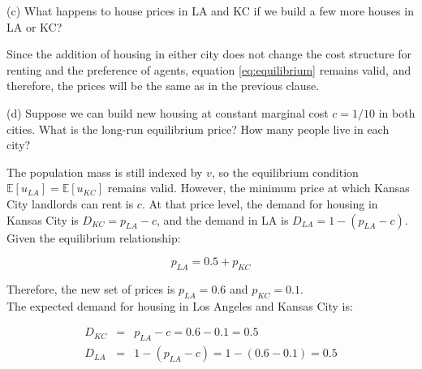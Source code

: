 \begin{tcolorbox}
    (c) What happens to house prices in LA and KC if we build a few more houses in LA or KC?
\end{tcolorbox}

\begin{myanswerbox}
    Since the addition of housing in either city does not change the cost structure for renting and the preference of agents, equation \ref{eq:equilibrium} remains valid, and therefore, the prices will be the same as in the previous clause.
\end{myanswerbox}
\begin{tcolorbox}
    (d) Suppose we can build new housing at constant marginal cost \( c = 1/10 \) in both cities. What is the long-run equilibrium price? How many people live in each city?
\end{tcolorbox}

The population mass is still indexed by \( v \), so the equilibrium condition \( \mathbb{E}[u_{LA}] = \mathbb{E}[u_{KC}] \) remains valid. However, the minimum price at which Kansas City landlords can rent is \( c \). At that price level, the demand for housing in Kansas City is \( D_{KC} = p_{LA} - c \), and the demand in LA is \( D_{LA} = 1 - (p_{LA} - c). \)\\

Given the equilibrium relationship: 

    \begin{equation*}
    p_{LA} = 0.5 + p_{KC}
\end{equation*}

\begin{myanswerbox}
    
    Therefore, the new set of prices is \( p_{LA} = 0.6 \) and \( p_{KC} = 0.1 \).\\

    The expected demand for housing in Los Angeles and Kansas City is:

    \begin{eqnarray*}
        D_{KC} &=& p_{LA} - c = 0.6 - 0.1 = 0.5\\
        D_{LA} &=& 1 - (p_{LA} - c) = 1 - (0.6 - 0.1) = 0.5\\
    \end{eqnarray*}

\end{myanswerbox}


